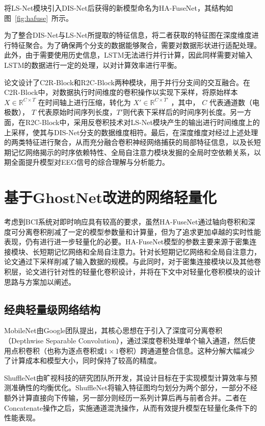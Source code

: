 将LS-Net模块引入DIS-Net后获得的新模型命名为HA-FuseNet，其结构如图~\ref{fig:hafuse}~所示。

为了整合DIS-Net与LS-Net所提取的特征信息，将二者获取的特征图在深度维度进行特征聚合。为了确保两个分支的数据能够聚合，需要对数据形状进行适配处理。此外，由于需要使用历史信息，LSTM无法进行并行计算，因此同样需要对输入LSTM的数据进行一定的处理，以对计算效率进行平衡。

论文设计了C2R-Block和R2C-Block两种模块，用于并行分支间的交互融合。在C2R-Block中，对数据执行时间维度的卷积操作以实现下采样，将原始样本 \(X \in \mathbb{R}^{C \times T}\) 在时间轴上进行压缩，转化为 \(X' \in \mathbb{R}^{C \times T'}\) ，其中， \(C\) 代表通道数（电极数）， \(T\) 代表原始时间序列长度，\(T'\)则代表下采样后的时间序列长度。另一方面，在R2C-Block中，采用反卷积技术对LS-Net模块产生的输出进行时间维度上的上采样，使其与DIS-Net分支的数据维度相符。最后，在深度维度对经过上述处理的两类特征进行聚合，从而充分融合卷积神经网络捕获的局部特征信息，以及长短期记忆网络揭示的时序依赖特性、全局自注意力模块发掘的全局时空依赖关系，以期全面提升模型对EEG信号的综合理解与分析能力。

\section{基于GhostNet改进的网络轻量化}

考虑到BCI系统对即时响应具有较高的要求，虽然HA-FuseNet通过轴向卷积和深度可分离卷积削减了一定的模型参数量和计算量，但为了追求更加卓越的实时性能表现，仍有进行进一步轻量化的必要。HA-FuseNet模型的参数主要来源于密集连接模块、长短期记忆网络和全局自注意力。针对长短期记忆网络和全局自注意力，论文通过下采样削减了输入数据的规模。与此同时，对于密集连接模块以及其他卷积层，论文进行针对性的轻量化卷积设计，并将在下文中对轻量化卷积模块的设计思路与方案加以阐述。

\subsection{经典轻量级网络结构}

MobileNet\cite{howard2017mobilenets}由Google团队提出，其核心思想在于引入了深度可分离卷积（Depthwise Separable Convolution），通过深度卷积处理单个输入通道，然后使用点积卷积（也称为逐点卷积或\(1 \times 1\)卷积）跨通道整合信息。这种分解大幅减少了计算成本和模型大小，同时保持了较高的精度。

ShuffleNet\cite{ma2018shufflenet}由旷视科技的研究团队所开发，其设计目标在于实现模型计算效率与预测准确性的均衡优化。ShuffleNet将输入特征图均匀划分为两个部分，一部分不经额外计算直接向下传输，另一部分则经历一系列计算后再与前者合并。二者在Concatenate操作之后，实施通道混洗操作，从而有效提升模型在轻量化条件下的性能表现。

